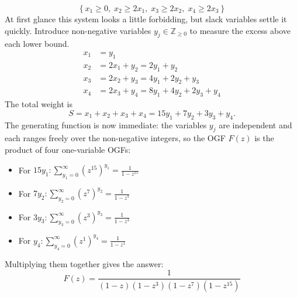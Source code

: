 \begin{equation*}
    \left\{x_{1}\geq 0,\; x_{2}\geq 2x_{1},\; x_{3}\geq 2x_{2},\; x_{4}\geq 2x_{3}\right\}
\end{equation*}
At first glance this system looks a little forbidding, but slack variables settle it quickly. Introduce non-negative variables
$y_{j} \in \mathbb{Z}_{\geq 0}$ to measure the excess above each lower bound.
\begin{align*}
    x_{1} &= y_{1} \\
    x_{2} &= 2x_{1} + y_{2} = 2y_{1} + y_{2} \\
    x_{3} &= 2x_{2} + y_{3} = 4y_{1} + 2y_{2} + y_{3} \\
    x_{4} &= 2x_{3} + y_{4} = 8y_{1} + 4y_{2} + 2y_{3} + y_{4}
\end{align*}
The total weight is
\begin{equation*}
    S = x_{1} + x_{2} + x_{3} + x_{4} = 15y_{1} + 7y_{2} + 3y_{3} + y_{4}.
\end{equation*}
The generating function is now immediate: the variables $y_{j}$ are independent and each ranges freely over
the non-negative integers, so the OGF $F(z)$ is the product of four one-variable OGFs:
\begin{itemize}
    \item For $15y_{1}: \sum_{y_{1} = 0}^{\infty}(z^{15})^{y_{1}} = \frac{1}{1 - z^{15}}$
    \item For $ 7y_{2}: \sum_{y_{2} = 0}^{\infty}(z^{ 7})^{y_{2}} = \frac{1}{1 - z^{ 7}}$
    \item For $ 3y_{3}: \sum_{y_{3} = 0}^{\infty}(z^{ 3})^{y_{3}} = \frac{1}{1 - z^{ 3}}$
    \item For $  y_{4}: \sum_{y_{4} = 0}^{\infty}(z^{ 1})^{y_{4}} = \frac{1}{1 - z^{ 1}}$
\end{itemize}
Multiplying them together gives the answer:
\begin{equation*}
    F(z) = \frac{1}{(1 -z)(1 -z^{3})(1 -z^{7})(1 -z^{15})}
\end{equation*}

